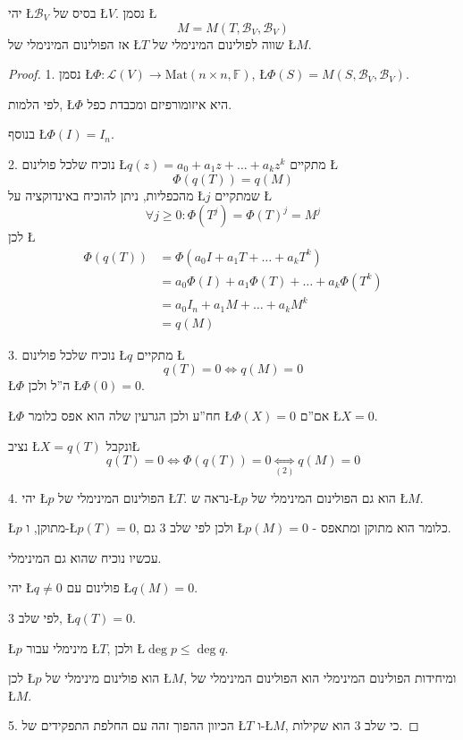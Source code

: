 \documentclass[english,hebrew]{article}
\begin{document}
יהי \L{$\mathcal{B}_{V}$} בסיס של \L{$V$}. נסמן \L{%
\[
M=M\left(T,\mathcal{B}_{V},\mathcal{B}_{V}\right)
\]
}%
אז הפולינום המינימלי של \L{$T$} שווה לפולינום המינימלי של \L{$M$}. 
\begin{proof}
1. נסמן \L{$\Phi:\mathcal{L}\left(V\right)\to\text{Mat}\left(n\times n,\mathbb{F}\right)$},
\L{$\Phi\left(S\right)=M\left(S,\mathcal{B}_{V},\mathcal{B}_{V}\right)$}.

לפי הלמות, \L{$\Phi$} היא איזומורפיזם ומכבדת כפל.

בנוסף \L{$\Phi\left(I\right)=I_{n}$}.

2. נוכיח שלכל פולינום \L{$q\left(z\right)=a_{0}+a_{1}z+\dots+a_{k}z^{k}$}
מתקיים \L{%
\[
\Phi\left(q\left(T\right)\right)=q\left(M\right)
\]
}%
מהכפליות, ניתן להוכיח באינדוקציה על \L{$j$} שמתקיים \L{%
\[
\forall j\ge0:\Phi\left(T^{j}\right)=\Phi\left(T\right)^{j}=M^{j}
\]
}%
לכן \L{%
\begin{align*}
\Phi\left(q\left(T\right)\right) & =\Phi\left(a_{0}I+a_{1}T+\dots+a_{k}T^{k}\right)\\
 & =a_{0}\Phi\left(I\right)+a_{1}\Phi\left(T\right)+\dots+a_{k}\Phi\left(T^{k}\right)\\
 & =a_{0}I_{n}+a_{1}M+\dots+a_{k}M^{k}\\
 & =q\left(M\right)
\end{align*}
}%

3. נוכיח שלכל פולינום \L{$q$} מתקיים \L{%
\[
q\left(T\right)=0\iff q\left(M\right)=0
\]
}%
\L{$\Phi$} ה\textquotedblright ל ולכן \L{$\Phi\left(0\right)=0$}.

\L{$\Phi$} חח\textquotedblright ע ולכן הגרעין שלה הוא אפס כלומר \L{$\Phi\left(X\right)=0$}
אם\textquotedblright ם \L{$X=0$}.

נציב \L{$X=q(T)$} ונקבל\L{%
\[
q\left(T\right)=0\iff\Phi\left(q\left(T\right)\right)=0\underset{(2)}{\iff}q\left(M\right)=0
\]
}%

4. יהי \L{$p$} הפולינום המינימלי של \L{$T$}. נראה ש-\L{$p$} הוא
גם הפולינום המינימלי של \L{$M$}.

\L{$p$} מתוקן, ו-\L{$p\left(T\right)=0$}, ולכן לפי שלב 3 גם \L{$p\left(M\right)=0$}
- כלומר הוא מתוקן ומתאפס.

עכשיו נוכיח שהוא גם המינימלי.

יהי \L{$q\neq0$} פולינום עם \L{$q\left(M\right)=0$}.

לפי שלב 3, \L{$q\left(T\right)=0$}.

\L{$p$} מינימלי עבור \L{$T$}, ולכן \L{$\deg p\leq\deg q$}.

לכן \L{$p$} הוא פולינום מינימלי של \L{$M$}, ומיחידות הפולינום המינימלי
הוא הפולינום המינימלי של \L{$M$}.

5. הכיוון ההפוך זהה עם החלפת התפקידים של \L{$T$} ו-\L{$M$}, כי שלב
3 הוא שקילות. 
\end{proof}
\end{document}
